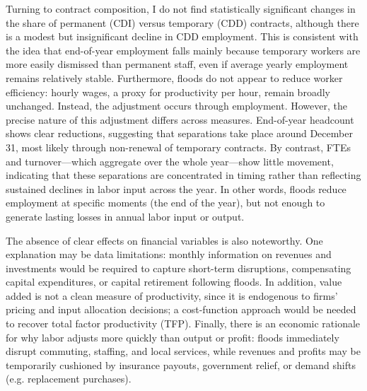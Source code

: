 Turning to contract composition, I do not find statistically significant changes in the share of permanent (CDI) versus temporary (CDD) contracts, although there is a modest but insignificant decline in CDD employment. This is consistent with the idea that end-of-year employment falls mainly because temporary workers are more easily dismissed than permanent staff, even if average yearly employment remains relatively stable. Furthermore, floods do not appear to reduce worker efficiency: hourly wages, a proxy for productivity per hour, remain broadly unchanged. Instead, the adjustment occurs through employment. However, the precise nature of this adjustment differs across measures. End-of-year headcount shows clear reductions, suggesting that separations take place around December 31, most likely through non-renewal of temporary contracts. By contrast, FTEs and turnover—which aggregate over the whole year—show little movement, indicating that these separations are concentrated in timing rather than reflecting sustained declines in labor input across the year. In other words, floods reduce employment at specific moments (the end of the year), but not enough to generate lasting losses in annual labor input or output.

The absence of clear effects on financial variables is also noteworthy. One explanation may be data limitations: monthly information on revenues and investments would be required to capture short-term disruptions, compensating capital expenditures, or capital retirement following floods. In addition, value added is not a clean measure of productivity, since it is endogenous to firms’ pricing and input allocation decisions; a cost-function approach would be needed to recover total factor productivity (TFP). Finally, there is an economic rationale for why labor adjusts more quickly than output or profit: floods immediately disrupt commuting, staffing, and local services, while revenues and profits may be temporarily cushioned by insurance payouts, government relief, or demand shifts (e.g. replacement purchases).
\vspace{0.5cm}


%
%





